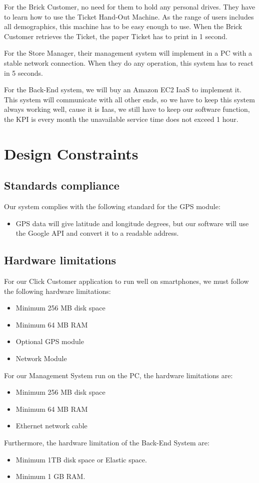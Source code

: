 \documentclass[a4paper,12pt]{report}
\begin{document}
For the Brick Customer, no need for them to hold any personal drives. They have to learn how to use the Ticket Hand-Out Machine. As the range of users includes all demographics, this machine has to be easy enough to use. When the Brick Customer retrieves the Ticket, the paper Ticket has to print in 1 second.

For the Store Manager, their management system will implement in a PC with a stable network connection. When they do any operation, this system has to react in 5 seconds.

For the Back-End system, we will buy an Amazon EC2 IaaS to implement it. This system will communicate with all other ends, so we have to keep this system always working well, cause it is Iaas, we still have to keep our software function, the KPI is every month the unavailable service time does not exceed 1 hour.


\section{Design Constraints}
\subsection{Standards compliance}
Our system complies with the following standard for the GPS module:
\begin{itemize}
	\item GPS data will give latitude and longitude degrees, but our software will use the Google API and convert it to a readable address.
\end{itemize}


\subsection{Hardware limitations}

For our Click Customer application to run well on smartphones, we must follow the following hardware limitations:
\begin{itemize}
	\item Minimum 256 MB disk space
	\item Minimum 64 MB RAM
	\item Optional GPS module
	\item Network Module
\end{itemize} 
\vspace{5mm}
For our Management System run on the PC, the hardware limitations are:
\begin{itemize}
	\item Minimum 256 MB disk space
	\item Minimum 64 MB RAM
	\item Ethernet network cable
\end{itemize} 
\vspace{5mm}
Furthermore, the hardware limitation of the Back-End System are:
\begin{itemize}
	\item Minimum 1TB disk space or Elastic space.
	\item Minimum 1 GB RAM.
\end{itemize}
\end{document}

